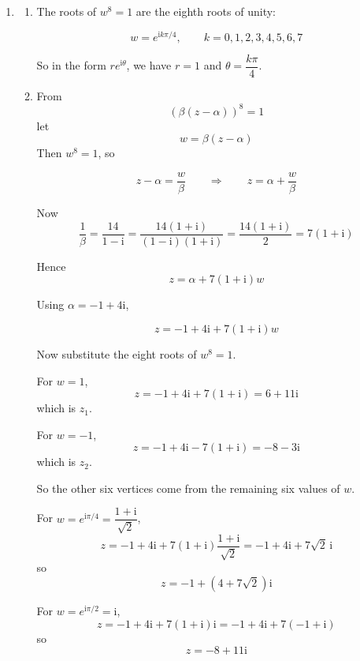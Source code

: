 \documentclass[leqno]{article}
\begin{document}
\begin{enumerate}[
  label=\textbf{\arabic*.},
  leftmargin=*,
  topsep=0pt,
  partopsep=0pt,
  parsep=0pt
]
\begin{tcolorbox}[colback=white, colframe=scarlet, title={\textbf{Solution}}, breakable, grow to left by=6mm, grow to right by=10mm]
\begin{enumerate}[label=\textbf{(\alph*)}]
\[
z_1-\alpha=(6+11\mathrm{i})-(-1+4\mathrm{i})
=7+7\mathrm{i}
=7(1+\mathrm{i})
\]

Now multiply by $\beta$:

\[
\beta(z_1-\alpha)=\frac{1-\mathrm{i}}{14}\cdot 7(1+\mathrm{i})
=\frac{(1-\mathrm{i})(1+\mathrm{i})}{2}
\]

Using $(1-\mathrm{i})(1+\mathrm{i})=1-\mathrm{i}^2=2$,

\[
\beta(z_1-\alpha)=\frac{2}{2}=1
\]

Hence $\beta(z_1-\alpha)=1$.

  \item 
  \begin{enumerate}[label=(\roman*)]
    \item The roots of $w^8=1$ are the eighth roots of unity:

\[
w=e^{\mathrm{i}k\pi/4},\qquad k=0,1,2,3,4,5,6,7
\]

So in the form $re^{\mathrm{i}\theta}$, we have $r=1$ and $\theta=\dfrac{k\pi}{4}$.

    \item From
\[
(\beta(z-\alpha))^8=1
\]
let
\[
w=\beta(z-\alpha)
\]
Then $w^8=1$, so

\[
z-\alpha=\frac{w}{\beta}
\qquad\Rightarrow\qquad
z=\alpha+\frac{w}{\beta}
\]

Now
\[
\frac{1}{\beta}=\frac{14}{1-\mathrm{i}}
=\frac{14(1+\mathrm{i})}{(1-\mathrm{i})(1+\mathrm{i})}
=\frac{14(1+\mathrm{i})}{2}
=7(1+\mathrm{i})
\]

Hence
\[
z=\alpha+7(1+\mathrm{i})w
\]

Using $\alpha=-1+4\mathrm{i}$,

\[
z=-1+4\mathrm{i}+7(1+\mathrm{i})w
\]

Now substitute the eight roots of $w^8=1$.

For $w=1$,
\[
z=-1+4\mathrm{i}+7(1+\mathrm{i})=6+11\mathrm{i}
\]
which is $z_1$.

For $w=-1$,
\[
z=-1+4\mathrm{i}-7(1+\mathrm{i})=-8-3\mathrm{i}
\]
which is $z_2$.

So the other six vertices come from the remaining six values of $w$.

For $w=e^{\mathrm{i}\pi/4}=\dfrac{1+\mathrm{i}}{\sqrt2}$,
\[
z=-1+4\mathrm{i}+7(1+\mathrm{i})\frac{1+\mathrm{i}}{\sqrt2}
=-1+4\mathrm{i}+7\sqrt2\,\mathrm{i}
\]
so
\[
z=-1+(4+7\sqrt2)\mathrm{i}
\]

For $w=e^{\mathrm{i}\pi/2}=\mathrm{i}$,
\[
z=-1+4\mathrm{i}+7(1+\mathrm{i})\mathrm{i}
=-1+4\mathrm{i}+7(-1+\mathrm{i})
\]
so
\[
z=-8+11\mathrm{i}
\]


\end{enumerate}
\end{enumerate}
\end{tcolorbox}
\end{enumerate}
\end{document}
